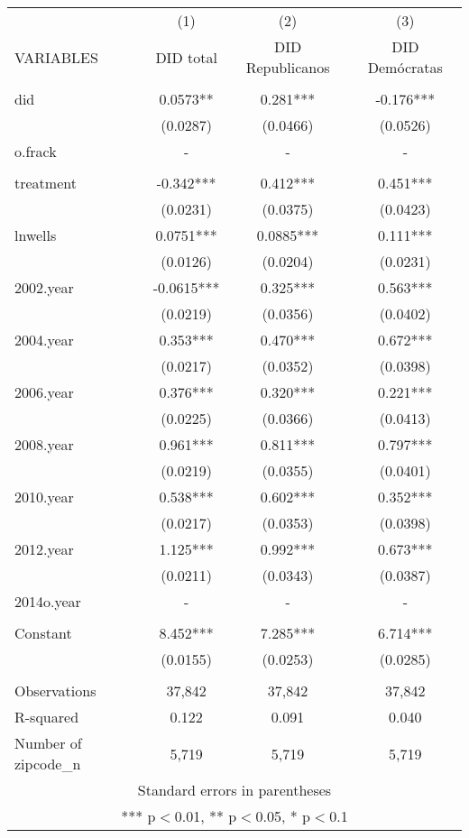 \begin{tabular}{lccc} \hline
 & (1) & (2) & (3) \\
VARIABLES & DID total & DID Republicanos & DID Demócratas \\ \hline
 &  &  &  \\
did & 0.0573** & 0.281*** & -0.176*** \\
 & (0.0287) & (0.0466) & (0.0526) \\
o.frack & - & - & - \\
 &  &  &  \\
treatment & -0.342*** & 0.412*** & 0.451*** \\
 & (0.0231) & (0.0375) & (0.0423) \\
lnwells & 0.0751*** & 0.0885*** & 0.111*** \\
 & (0.0126) & (0.0204) & (0.0231) \\
2002.year & -0.0615*** & 0.325*** & 0.563*** \\
 & (0.0219) & (0.0356) & (0.0402) \\
2004.year & 0.353*** & 0.470*** & 0.672*** \\
 & (0.0217) & (0.0352) & (0.0398) \\
2006.year & 0.376*** & 0.320*** & 0.221*** \\
 & (0.0225) & (0.0366) & (0.0413) \\
2008.year & 0.961*** & 0.811*** & 0.797*** \\
 & (0.0219) & (0.0355) & (0.0401) \\
2010.year & 0.538*** & 0.602*** & 0.352*** \\
 & (0.0217) & (0.0353) & (0.0398) \\
2012.year & 1.125*** & 0.992*** & 0.673*** \\
 & (0.0211) & (0.0343) & (0.0387) \\
2014o.year & - & - & - \\
 &  &  &  \\
Constant & 8.452*** & 7.285*** & 6.714*** \\
 & (0.0155) & (0.0253) & (0.0285) \\
 &  &  &  \\
Observations & 37,842 & 37,842 & 37,842 \\
R-squared & 0.122 & 0.091 & 0.040 \\
 Number of zipcode\_n & 5,719 & 5,719 & 5,719 \\ \hline
\multicolumn{4}{c}{ Standard errors in parentheses} \\
\multicolumn{4}{c}{ *** p$<$0.01, ** p$<$0.05, * p$<$0.1} \\
\end{tabular}
